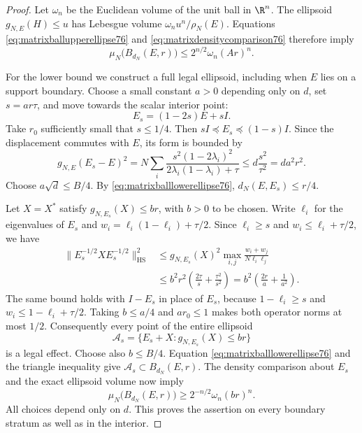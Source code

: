 \begin{proof}
Let $\omega_n$ be the Euclidean volume of the unit ball in $\R^n$.
The ellipsoid $g_{N,E}(H)\le u$ has Lebesgue volume
$\omega_nu^n/\rho_N(E)$. Equations
\eqref{eq:matrixballupperellipse76} and
\eqref{eq:matrixdensitycomparison76} therefore imply
\[
 \mu_N\bigl(B_{d_N}(E,r)\bigr)
                  \le2^{n/2}\omega_n(Ar)^n.
\]

For the lower bound we construct a full legal ellipsoid, including
when $E$ lies on a support boundary. Choose a small constant $a>0$
depending only on $d$, set $s=ar\tau$, and move towards the scalar
interior point:
\begin{equation}\label{eq:matrixinwardshift76}
 E_s=(1-2s)E+sI.
\end{equation}
Take $r_0$ sufficiently small that $s\le1/4$. Then
$sI\preceq E_s\preceq(1-s)I$. Since the displacement commutes with
$E$, its form is bounded by
\[
 g_{N,E}(E_s-E)^2
 =N\sum_i\frac{s^2(1-2\lambda_i)^2}
                    {2\lambda_i(1-\lambda_i)+\tau}
 \le d\frac{s^2}{\tau^2}=da^2r^2.
\]
Choose $a\sqrt d\le B/4$. By
\eqref{eq:matrixballlowerellipse76},
$d_N(E,E_s)\le r/4$.

Let $X=X^*$ satisfy $g_{N,E_s}(X)\le br$, with $b>0$ to be chosen.
Write $\ell_i$ for the eigenvalues of $E_s$ and
$w_i=\ell_i(1-\ell_i)+\tau/2$. Since $\ell_i\ge s$ and
$w_i\le\ell_i+\tau/2$, we have
\begin{align*}
 \|E_s^{-1/2}XE_s^{-1/2}\|_{\mathrm{HS}}^2
 &\le g_{N,E_s}(X)^2
       \max_{i,j}\frac{w_i+w_j}{N\ell_i\ell_j}\\
 &\le b^2r^2\left(\frac{2\tau}{s}
                         +\frac{\tau^2}{s^2}\right)
   =b^2\left(\frac{2r}{a}+\frac1{a^2}\right).
\end{align*}
The same bound holds with $I-E_s$ in place of $E_s$, because
$1-\ell_i\ge s$ and $w_i\le1-\ell_i+\tau/2$. Taking
$b\le a/4$ and $ar_0\le1$ makes both operator norms at most $1/2$.
Consequently every point of the entire ellipsoid
\[
 \mathcal A_s=\{E_s+X:g_{N,E_s}(X)\le br\}
\]
is a legal effect. Choose also $b\le B/4$. Equation
\eqref{eq:matrixballlowerellipse76} and the triangle inequality give
$\mathcal A_s\subset B_{d_N}(E,r)$. The density comparison about
$E_s$ and the exact ellipsoid volume now imply
\[
 \mu_N\bigl(B_{d_N}(E,r)\bigr)
           \ge2^{-n/2}\omega_n(br)^n.
\]
All choices depend only on $d$. This proves the assertion on every
boundary stratum as well as in the interior.
\end{proof}

